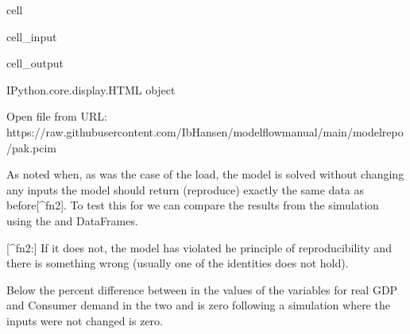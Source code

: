 \documentclass[letterpaper,10pt,english]{jupyterBook}
\begin{document}
\begin{sphinxuseclass}{cell}
\begin{sphinxVerbatimInput}
\begin{sphinxuseclass}{cell_input}
\end{sphinxuseclass}\end{sphinxVerbatimInput}
\begin{sphinxVerbatimOutput}

\begin{sphinxuseclass}{cell_output}
\begin{sphinxVerbatim}[commandchars=\\\{\}]
\PYGZlt{}IPython.core.display.HTML object\PYGZgt{}
\end{sphinxVerbatim}

\begin{sphinxVerbatim}[commandchars=\\\{\}]
Open file from URL:  https://raw.githubusercontent.com/IbHansen/modelflow\PYGZhy{}manual/main/model\PYGZus{}repo/pak.pcim
\end{sphinxVerbatim}

\end{sphinxuseclass}\end{sphinxVerbatimOutput}

\end{sphinxuseclass}
\sphinxAtStartPar
As noted when, as was the case of the load, the model is solved without changing any inputs the model should return (reproduce) exactly the same data as before{[}\textasciicircum{}fn2{]}.  To test this for  we can compare the results from the simulation using the  and  DataFrames.

\sphinxAtStartPar
{[}\textasciicircum{}fn2:{]} If it does not, the model has violated he principle of reproducibility and there is something wrong (usually one of the identities does not hold).

\sphinxAtStartPar
Below the percent difference between in the values of the variables for real GDP and Consumer demand  in the two   and  is zero following a simulation where the inputs were not changed is zero.
\end{document}
